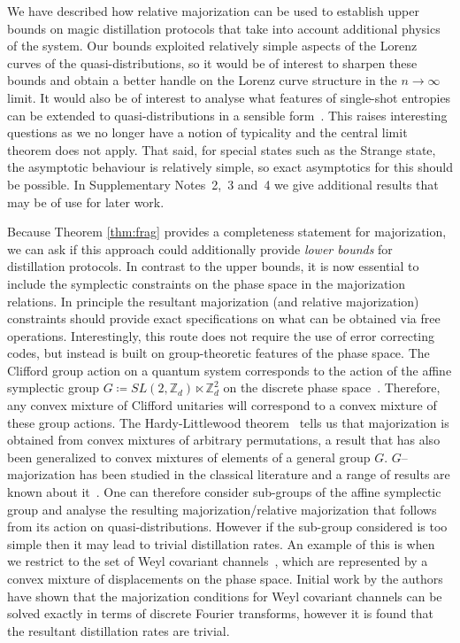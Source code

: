 \documentclass[
onecolumn,
superscriptaddress
]{revtex4-1}
\begin{document}
We have described how relative majorization can be used to establish upper bounds on magic distillation protocols that take into account additional physics of the system. Our bounds exploited relatively simple aspects of the Lorenz curves of the quasi-distributions, so it would be of interest to sharpen these bounds and obtain a better handle on the Lorenz curve structure in the $n\rightarrow \infty$ limit. It would also be of interest to analyse what features of single-shot entropies can be extended to quasi-distributions in a sensible form~\cite{renner_phd, tomamichel2013}. This raises interesting questions as we no longer have a notion of typicality and the central limit theorem does not apply. That said, for special states such as the Strange state, the asymptotic behaviour is relatively simple, so exact asymptotics for this should be possible. In Supplementary Notes~2,~3 and~4 we give additional results that may be of use for later work.

Because Theorem \ref{thm:frag}  provides a completeness statement for majorization, we can ask if this approach could additionally provide \emph{lower bounds} for distillation protocols. In contrast to the upper bounds, it is now essential to include the symplectic constraints on the phase space in the majorization relations. In principle the resultant majorization (and relative majorization) constraints should provide exact specifications on what can be obtained via free operations. 
Interestingly, this route does not require the use of error correcting codes, but instead is built on group-theoretic features of the phase space. 
The Clifford group action on a quantum system corresponds to the action of the affine symplectic group $G \coloneqq SL(2,\mathbb{Z}_d) \ltimes \mathbb{Z}_d^2$ on the discrete phase space~\cite{Appleby_2005, Bengtsson_2006}. Therefore, any convex mixture of Clifford unitaries will correspond to a convex mixture of these group actions. The Hardy-Littlewood theorem~\cite{hardy_1952} tells us that majorization is obtained from convex mixtures of arbitrary permutations, a result that has also been generalized to convex mixtures of elements of a general group $G$. $G$--majorization has been studied in the classical literature and a range of results are known about it~\cite{giovagnoli_1985, steerneman_1990, giovagnoli_cyclic_1996, eaton_1977}. 
One can therefore consider sub-groups of the affine symplectic group and analyse the resulting majorization/relative majorization that follows from its action on quasi-distributions. However if the sub-group considered is too simple then it may lead to trivial distillation rates. An example of this is when we restrict to the set of Weyl covariant channels~\cite{fukuda2006}, which are represented by a convex mixture of displacements on the phase space. Initial work by the authors have shown that the majorization conditions for Weyl covariant channels can be solved exactly in terms of discrete Fourier transforms, however it is found that the resultant distillation rates are trivial.  
\end{document}
